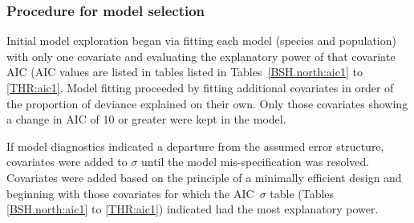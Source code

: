                                                                                        
\subsubsection{Procedure for model selection}
Initial model exploration began via fitting each model (species and population) with only one covariate and evaluating the explanatory power of that covariate \via AIC (AIC values are listed in tables  listed in Tables~\ref{BSH.north:aic1} to \ref{THR:aic1}. Model fitting proceeded by fitting additional covariates in order of the proportion of deviance explained  on their own.  Only those covariates showing a change in AIC of 10 or greater were kept in the model.

If model diagnostics indicated a departure from the assumed error structure, covariates were added to $\sigma$ until the model mis-specification was resolved. Covariates were added based on the principle of a minimally efficient design and beginning with those covariates for which the AIC~$\sigma$ table (Tables \ref{BSH.north:aic1} to \ref{THR:aic1}) indicated had the most explanatory power.  

